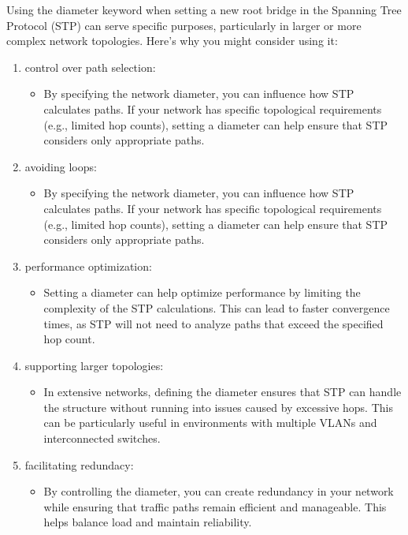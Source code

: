\documentclass{article}
\begin{document}
Using the diameter keyword when setting a new root bridge in the Spanning Tree Protocol (STP) can serve specific purposes, particularly in larger or more complex network topologies. Here’s why you might consider using it:
\begin{enumerate}[label = \arabic*]
\item control over path selection:
	\begin{itemize}
	\item By specifying the network diameter, you can influence how STP calculates paths. If your network has specific topological requirements (e.g., limited hop counts), setting a diameter can help ensure that STP considers only appropriate paths.
	\end{itemize}
\item avoiding loops:
	\begin{itemize}
	\item By specifying the network diameter, you can influence how STP calculates paths. If your network has specific topological requirements (e.g., limited hop counts), setting a diameter can help ensure that STP considers only appropriate paths.
	\end{itemize}
\item performance optimization:
	\begin{itemize}
	\item Setting a diameter can help optimize performance by limiting the complexity of the STP calculations. This can lead to faster convergence times, as STP will not need to analyze paths that exceed the specified hop count.
	\end{itemize}
\item supporting larger topologies:
	\begin{itemize}
	\item In extensive networks, defining the diameter ensures that STP can handle the structure without running into issues caused by excessive hops. This can be particularly useful in environments with multiple VLANs and interconnected switches.
	\end{itemize}
\item facilitating redundacy:
	\begin{itemize}
	\item By controlling the diameter, you can create redundancy in your network while ensuring that traffic paths remain efficient and manageable. This helps balance load and maintain reliability.
	\end{itemize}
\end{enumerate}
\end{document}
